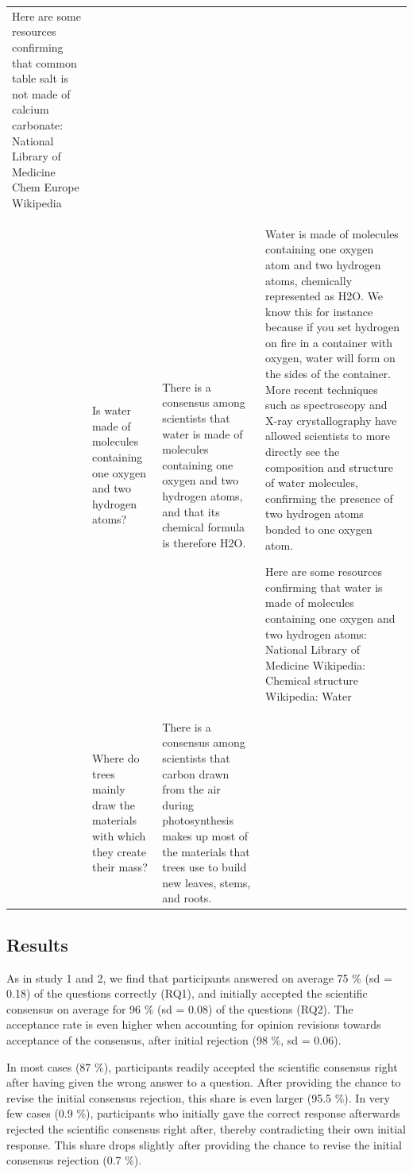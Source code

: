 \documentclass[
  doc,floatsintext]{apa6}
\begin{document}
\begin{longtable}[t]{>{\raggedleft\arraybackslash}p{1em}>{\raggedright\arraybackslash}p{10em}>{\raggedright\arraybackslash}p{10em}>{\raggedright\arraybackslash}p{23em}}
Here are some resources confirming that common table salt is not made of calcium carbonate: 
National Library of Medicine 
Chem Europe 
Wikipedia\\
10 & Is water made of molecules containing one oxygen and two hydrogen atoms? & There is a consensus among scientists that water is made of molecules containing one oxygen and two hydrogen atoms, and that its chemical formula is therefore H2O. & Water is made of molecules containing one oxygen atom and two hydrogen atoms, chemically represented as H2O. We know this for instance because if you set hydrogen on fire in a container with oxygen, water will form on the sides of the container. More recent techniques such as spectroscopy and X-ray crystallography have allowed scientists to more directly see the composition and structure of water molecules, confirming the presence of two hydrogen atoms bonded to one oxygen atom.

Here are some resources confirming that water is made of molecules containing one oxygen and two hydrogen atoms:
National Library of Medicine 
Wikipedia: Chemical structure 
Wikipedia: Water\\
\addlinespace
11 & Where do trees mainly draw the materials with which they create their mass? & There is a consensus among scientists that carbon drawn from the air during photosynthesis makes up most of the materials that trees use to build new leaves, stems, and roots. & \\
\bottomrule
\end{longtable}
\endgroup{}

\subsection{Results}\label{results-3}

As in study 1 and 2, we find that participants answered on average 75 \% (sd = 0.18) of the questions correctly (RQ1), and initially accepted the scientific consensus on average for 96 \% (sd = 0.08) of the questions (RQ2). The acceptance rate is even higher when accounting for opinion revisions towards acceptance of the consensus, after initial rejection (98 \%, sd = 0.06).

In most cases (87 \%), participants readily accepted the scientific consensus right after having given the wrong answer to a question. After providing the chance to revise the initial consensus rejection, this share is even larger (95.5 \%). In very few cases (0.9 \%), participants who initially gave the correct response afterwards rejected the scientific consensus right after, thereby contradicting their own initial response. This share drops slightly after providing the chance to revise the initial consensus rejection (0.7 \%).
\end{document}
